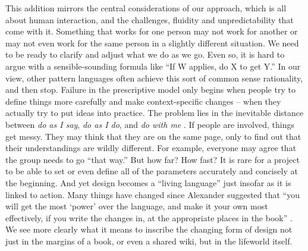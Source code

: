 \begin{refsection}

This addition mirrors the central considerations of our approach, which is all about human interaction, and the challenges, fluidity and unpredictability that come with it.  Something that works for one person may not work for another or may not even work for the same person in a slightly different situation.  We need to be ready to clarify and adjust what we do as we go.   Even so, it is hard to argue with a sensible-sounding formula like ``If W applies, do X to get Y.'' In our view, other pattern languages often achieve this sort of common sense rationality, and then stop.  Failure in the prescriptive model only begins when people try to define things more carefully and make context-specific changes -- when they actually try to put ideas into practice.  The problem lies in the inevitable distance between \emph{do as I say}, \emph{do as I do}, and \emph{do with me} \cite[p.~26]{deleuze1994difference}.
If people are involved, things get messy.   They may think that they are on the same page, only to find out that their understandings are wildly different.  For  example, everyone may agree that the group needs to go ``that way.''  But how far?  How fast?  It is rare for a project to be able to set or even define all of the parameters accurately and concisely at the beginning.
And yet design becomes a ``living language'' \cite[p.~xvii]{alexander1977pattern}  just insofar as it is linked to action.  Many things have changed since Alexander suggested that ``you will get the most `power' over the language, and make it your own most effectively, if you write the changes in, at the appropriate places in the book'' \cite[p.~xl]{alexander1977pattern}.  We see more clearly what it means to inscribe the changing form of design not just in the margins of a book, or even a shared wiki, but in the lifeworld itself.



\end{refsection}
